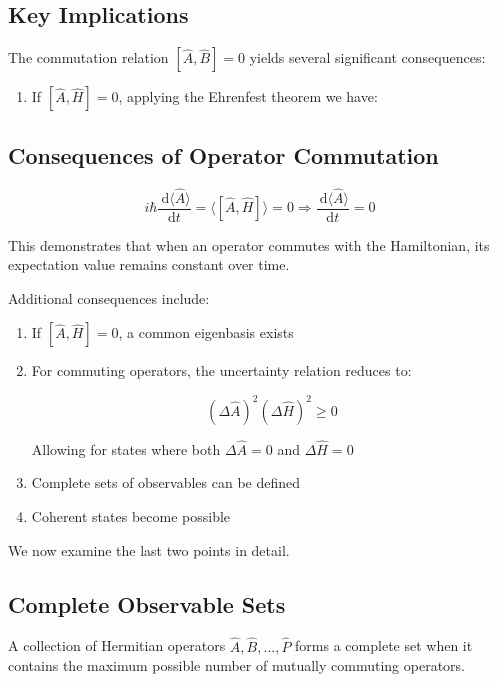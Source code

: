 \documentclass[italian]{HKNdocument}
\begin{document}
\subsection{Key Implications}
The commutation relation $[\hat{A}, \hat{B}]=0$ yields several significant consequences:

\begin{enumerate}
  \item If $[\hat{A}, \hat{H}]=0$, applying the Ehrenfest theorem we have:
\end{enumerate}


\subsection{Consequences of Operator Commutation}

\begin{equation}
i \hbar \frac{\mathrm{~d}\langle\hat{A}\rangle}{\mathrm{d} t}=\langle[\hat{A}, \hat{H}]\rangle=0 \Longrightarrow \frac{\mathrm{~d}\langle\hat{A}\rangle}{\mathrm{d} t}=0 \label{eq:7.36}
\end{equation}

This demonstrates that when an operator commutes with the Hamiltonian, its expectation value remains constant over time.

Additional consequences include:
\begin{enumerate}
  \item If $[\hat{A}, \hat{H}]=0$, a common eigenbasis exists
  \item For commuting operators, the uncertainty relation reduces to:

\begin{equation}
(\Delta \hat{A})^{2}(\Delta \hat{H})^{2} \geq 0 \label{eq:7.37}
\end{equation}

  Allowing for states where both $\Delta \hat{A}=0$ and $\Delta \hat{H}=0$
  \item Complete sets of observables can be defined
  \item Coherent states become possible
\end{enumerate}

We now examine the last two points in detail.

\subsection{Complete Observable Sets}
A collection of Hermitian operators $\hat{A}, \hat{B}, \ldots, \hat{P}$ forms a complete set when it contains the maximum possible number of mutually commuting operators.
\end{document}
